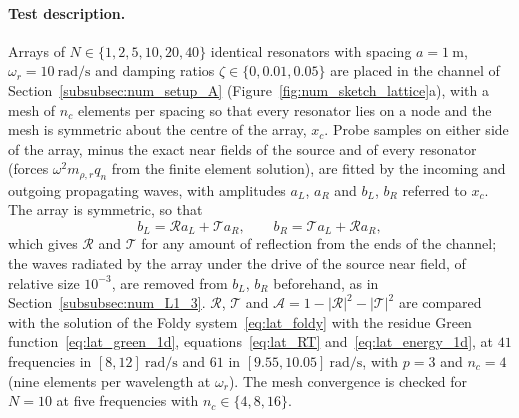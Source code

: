 {\paragraph{Test description.} Arrays of $N\in\{1,2,5,10,20,40\}$ identical resonators with spacing $a=1~\si{\meter}$, $\omega_r=10~\si{\radian\per\second}$ and damping ratios $\zeta\in\{0,0.01,0.05\}$ are placed in the channel of Section~\ref{subsubsec:num_setup_A} (Figure~\ref{fig:num_sketch_lattice}a), with a mesh of $n_c$ elements per spacing so that every resonator lies on a node and the mesh is symmetric about the centre of the array, $x_c$. Probe samples on either side of the array, minus the exact near fields of the source and of every resonator (forces $\omega^2m_{\rho,r}q_n$ from the finite element solution), are fitted by the incoming and outgoing propagating waves, with amplitudes $a_L$, $a_R$ and $b_L$, $b_R$ referred to $x_c$. The array is symmetric, so that
\begin{equation}\label{eq:num_two_port}
    b_L=\mathcal{R}a_L+\mathcal{T}a_R,\qquad b_R=\mathcal{T}a_L+\mathcal{R}a_R ,
\end{equation}
which gives $\mathcal{R}$ and $\mathcal{T}$ for any amount of reflection from the ends of the channel; the waves radiated by the array under the drive of the source near field, of relative size $10^{-3}$, are removed from $b_L$, $b_R$ beforehand, as in Section~\ref{subsubsec:num_L1_3}. $\mathcal{R}$, $\mathcal{T}$ and $\mathcal{A}=1-|\mathcal{R}|^2-|\mathcal{T}|^2$ are compared with the solution of the Foldy system~\eqref{eq:lat_foldy} with the residue Green function~\eqref{eq:lat_green_1d}, equations~\eqref{eq:lat_RT} and~\eqref{eq:lat_energy_1d}, at $41$ frequencies in $[8,12]~\si{\radian\per\second}$ and $61$ in $[9.55,10.05]~\si{\radian\per\second}$, with $p=3$ and $n_c=4$ (nine elements per wavelength at $\omega_r$). The mesh convergence is checked for $N=10$ at five frequencies with $n_c\in\{4,8,16\}$.

}
